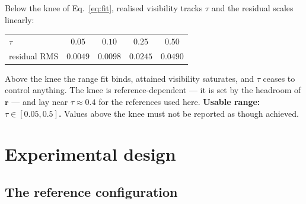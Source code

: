\documentclass[11pt,a4paper]{article}
\begin{document}
Below the knee of Eq.~\eqref{eq:fit}, realised visibility tracks $\tau$ and
the residual scales linearly:
\begin{center}
\begin{tabular}{@{}lcccc@{}}
\toprule
$\tau$ & $0.05$ & $0.10$ & $0.25$ & $0.50$ \\
residual RMS & $0.0049$ & $0.0098$ & $0.0245$ & $0.0490$ \\
\bottomrule
\end{tabular}
\end{center}
Above the knee the range fit binds, attained visibility saturates, and
$\tau$ ceases to control anything. The knee is reference-dependent --- it is
set by the headroom of $\mathbf{r}$ --- and lay near $\tau\approx0.4$ for
the references used here. \textbf{Usable range: $\tau\in[0.05,0.5]$.} Values
above the knee must not be reported as though achieved.

\section{Experimental design}
\label{sec:design}

\subsection{The reference configuration}
\end{document}
